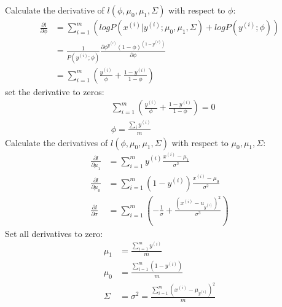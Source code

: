 \begin{answer}
Calculate the derivative of $l(\phi, \mu_0, \mu_1, \Sigma)$ with respect to $\phi$:
\begin{align*}
    \frac{\partial l}{\partial \phi} &= \sum\limits_{i=1}^m (log P(x^{(i)}|y^{(i)};\mu_0,\mu_1,\Sigma) + log P(y^{(i)};\phi))\\
    &= \frac{1}{P(y^{(i)}; \phi)} \frac{\partial \phi^{y^{(i)}} (1 - \phi)^{(1 - y^{(i)})} }{\partial \phi}\\
    &= \sum\limits_{i=1}^m(\frac{y^{(i)}}{\phi} + \frac{1 - y^{(i)}}{1 - \phi})
\end{align*}
set the derivative to zeros:
\begin{align*}
    &\sum\limits_{i=1}^m(\frac{y^{(i)}}{\phi} + \frac{1 - y^{(i)}}{1 - \phi}) = 0\\
    &\phi = \frac{\sum\limits_i y^{(i)}}{m}
\end{align*}
Calculate the derivatives of $l(\phi, \mu_0, \mu_1, \Sigma)$ with respect to $\mu_0,\mu_1, \Sigma$:
\begin{align*}
    \frac{\partial l}{\partial \mu_1} &= \sum\limits_{i=1}^m y^{(i)} \frac{x^{(i)} - \mu_1}{\sigma^2}\\
    \frac{\partial l}{\partial \mu_0} &= \sum\limits_{i=1}^m (1 - y^{(i)}) \frac{x^{(i)} - \mu_0}{\sigma^2}\\
    \frac{\partial l}{\partial \sigma} &= \sum\limits_{i=1}^m (-\frac{1}{\sigma} + \frac{(x^{(i)} - u_{y^{(i)}})^2}{\sigma^3})
\end{align*}
Set all derivatives to zero:
\begin{align*}
    \mu_1 &= \frac{\sum\limits_{i=1}^m y^{(i)}}{m}\\
    \mu_0 &= \frac{\sum\limits_{i=1}^m (1 - y^{(i)})}{m}\\
    \Sigma &= \sigma^2 = \frac{\sum\limits_{i=1}^m (x^{(i)} - \mu_{y^{(i)}})^2}{m}
\end{align*}
\end{answer}
